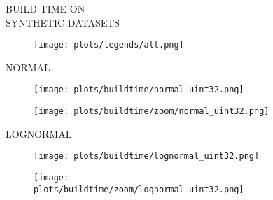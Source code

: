 \documentclass{article}
\begin{document}
\begin{figure}[!htbp]
\fbox
{
\begin{minipage}[t][0.98\textheight][t]{\textwidth}
\centering
\vspace*{-5px}
    \begin{minipage}{0.2\linewidth}
    \footnotesize{BUILD TIME ON \\ SYNTHETIC DATASETS}
    \end{minipage}
   \begin{minipage}{0.75\linewidth}
        \begin{figure}[H]
        \texttt{[image: plots/legends/all.png]}
        \end{figure}
    \end{minipage}
    \vspace*{-14px}
    
    \begin{minipage}{0.03\linewidth}
    \begin{sideways}\small NORMAL\end{sideways}
    \end{minipage}
    \begin{minipage}{0.38\linewidth}
        \begin{figure}[H]
        \texttt{[image: plots/buildtime/normal\_uint32.png]}
        \end{figure}
    \end{minipage}
    \begin{minipage}{0.38\linewidth}
        \begin{figure}[H]
            \texttt{[image: plots/buildtime/zoom/normal\_uint32.png]}
        \end{figure}
    \end{minipage}
\vspace*{-0.6cm}

\begin{minipage}{0.03\linewidth}
    \begin{sideways}\small LOGNORMAL\end{sideways}
    \end{minipage}
    \begin{minipage}{0.38\linewidth}
        \begin{figure}[H]
        \texttt{[image: plots/buildtime/lognormal\_uint32.png]}
        \end{figure}
    \end{minipage}
    \begin{minipage}{0.38\linewidth}
        \begin{figure}[H]
            \texttt{[image: plots/buildtime/zoom/lognormal\_uint32.png]}
        \end{figure}
    \end{minipage}
\vspace*{-0.6cm}


\end{minipage}}
\end{figure}
\end{document}
